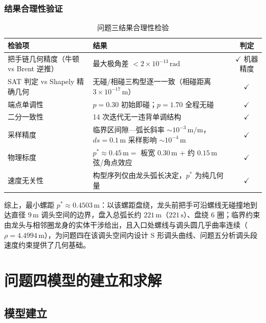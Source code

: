 ﻿\documentclass{cumcmthesis}
\begin{document}
\subsubsection{结果合理性验证}
\begin{table}[H]
\centering
\caption{问题三结果合理性检验}
\label{tab:p3check}
\footnotesize
\begin{tabular}{llc}
\toprule
检验项 & 结果 & 判定 \\
\midrule
把手链几何精度（牛顿 vs Brent 逆推） & 最大极角差 $<2\times10^{-13}\,\text{rad}$ & $\checkmark$ 机器精度 \\
SAT 判定 vs Shapely 精确几何 & 无碰/相碰三构型逐一一致（相碰距离 $3\times10^{-17}\,\text{m}$） & $\checkmark$ \\
端点单调性 & $p=0.30$ 初始即碰；$p=1.70$ 全程无碰 & $\checkmark$ \\
二分一致性 & 14 次迭代无一违背单调结构 & $\checkmark$ \\
采样精度 & 临界区间隙—弧长斜率 $\sim10^{-3}\,\text{m/m}$，$ds=0.1\,\text{m}$ 采样影响 $\sim10^{-4}\,\text{m}$ & $\checkmark$ \\
物理标度 & $p^{*}\approx0.45\,\text{m}=$ 板宽 $0.30\,\text{m}$ + 约 $0.15\,\text{m}$ 弦/角点效应 & $\checkmark$ \\
速度无关性 & 构型序列仅由龙头弧长决定，$p^{*}$ 为纯几何量 & $\checkmark$ \\
\bottomrule
\end{tabular}
\end{table}

综上，最小螺距 $p^{*}\approx0.4503\,\text{m}$：以该螺距盘绕，龙头前把手可沿螺线无碰撞地到达直径 $9\,\text{m}$ 调头空间的边界，盘入总弧长约 $221\,\text{m}$（$221\,\text{s}$）、盘绕 6 圈；临界约束由龙头与相邻圈龙身的实体干涉给出，且入口处螺线与调头圆几乎曲率连续（$\rho=4.4994\,\text{m}$），为问题四在该调头空间内设计 S 形调头曲线、问题五分析调头段速度约束提供了几何基础。

\section{问题四模型的建立和求解}

\subsection{模型建立}
\end{document}
